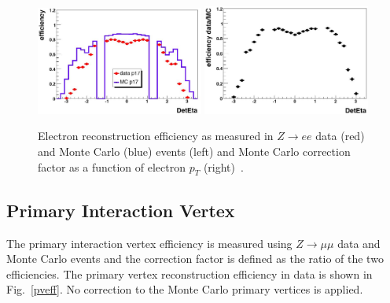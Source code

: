 \begin{figure}[!h!tbp]
\begin{center}
\includegraphics[width=0.49\textwidth]{eps/Reco/Electron_Likelihood_eff.eps}
\includegraphics[width=0.49\textwidth]{eps/Reco/Electron_Likelihood_scale.eps}
\end{center}
\vspace{-0.1in}
\caption{Electron reconstruction efficiency as measured in $Z\rightarrow ee$ data (red) and Monte Carlo (blue) events (left) and Monte Carlo correction factor as a function of electron $p_{T}$ (right)~\cite{electron}.}
\label{electronlikelihoodeffscale}
\end{figure}

\subsection{Primary Interaction Vertex}

The primary interaction vertex efficiency is measured using $Z\rightarrow \mu\mu$ data and Monte Carlo events and the correction factor is defined as the ratio of the two efficiencies. The primary vertex reconstruction efficiency in data is shown in Fig.~\ref{pveff}. No correction to the Monte Carlo primary vertices is applied.

